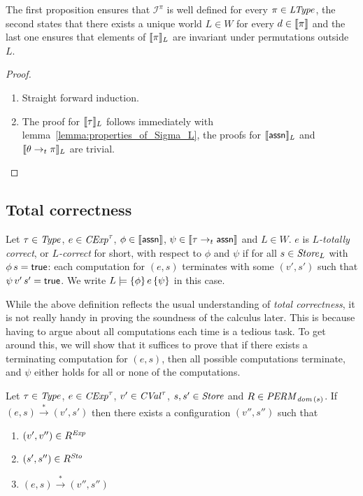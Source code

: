 \documentclass[12pt,a4paper]{report}
\newcommand{\CExp}{\nstyle{CExp}}
\newcommand{\CVal}{\nstyle{CVal}}
\newcommand{\Sto}{\nstyle{Sto}}
\newcommand{\PERM}{\nstyle{PERM}}
\newcommand{\I}{\mathcal{I}}
\begin{document}
The first proposition ensures that $\I^\pi$ is well defined for every $\pi\in\mathit{LType}$, the
second states that there exists a unique world $L \in W$ for every $d \in \llbracket\pi\rrbracket$ and
the last one ensures that elements of $\llbracket\pi\rrbracket_L$ are invariant under permutations
outside $L$.

\begin{proof} \
  \begin{enumerate}
    \item Straight forward induction.

    \item The proof for $\llbracket\tau\rrbracket_L$ follows immediately with
          lemma~\ref{lemma:properties_of_Sigma_L}, the proofs for
          $\llbracket\mathsf{assn}\rrbracket_L$ and $\llbracket\theta\rightarrow_t\pi\rrbracket_L$
          are trivial.
  \end{enumerate}
\end{proof}



\subsection{Total correctness}

\begin{definition}
  Let $\tau\in\mathit{Type}$, $e\in\CExp^\tau$, $\phi\in\llbracket\mathsf{assn}\rrbracket$, $\psi\in\llbracket\tau\rightarrow_t\mathsf{assn}\rrbracket$
  and $L\in W$. $e$ is {\em $L$-totally correct}, or {\em $L$-correct} for short, with respect to $\phi$ and
  $\psi$ if for all $s\in\mathit{Store}_L$ with $\phi\,s=\mathsf{true}$: each computation for $(e,s)$ terminates with some
  $(v',s')$ such that $\psi\,v'\,s'=\mathsf{true}$. We write $L \models \{\phi\}\,e\,\{\psi\}$ in this case.
\end{definition}

While the above definition reflects the usual understanding of {\em total correctness}, it is not really handy
in proving the soundness of the calculus later. This is because having to argue about all computations each
time is a tedious task. To get around this, we will show that it suffices to prove that if there exists a
terminating computation for $(e,s)$, then all possible computations terminate, and $\psi$ either holds for all
or none of the computations.

\begin{lemma}
  Let $\tau\in\mathit{Type}$, $e\in\CExp^\tau$, $v'\in\CVal^\tau$, $s,s'\in\mathit{Store}$
  and $R \in \PERM_{\dom{s}}$. If $(e,s)\xrightarrow*(v',s')$ then there
  exists a configuration $(v'',s'')$ such that
  \begin{enumerate}
    \item $(v',v'')\in R^{\mathit{Exp}}$
    \item $(s',s'')\in R^\Sto$
    \item $(e,s) \xrightarrow* (v'',s'')$
  \end{enumerate}
\end{lemma}
\end{document}
